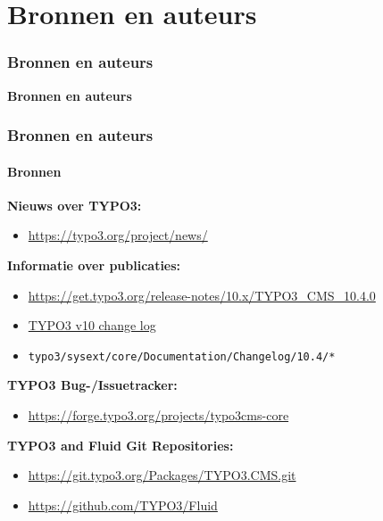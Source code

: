 %

\section{Bronnen en auteurs}
\begin{frame}[fragile]
	\frametitle{Bronnen en auteurs}

	\begin{center}\huge{\color{typo3darkgrey}\textbf{Bronnen en auteurs}}\end{center}
	\begin{center}\large{\textit{}}\end{center}

\end{frame}


\begin{frame}[fragile]
	\frametitle{Bronnen en auteurs}
	\framesubtitle{Bronnen}

	\textbf{Nieuws over TYPO3:}
		\begin{itemize}\smaller
			\item \url{https://typo3.org/project/news/}
		\end{itemize}

	\textbf{Informatie over publicaties:}
		\begin{itemize}\smaller
			\item \url{https://get.typo3.org/release-notes/10.x/TYPO3_CMS_10.4.0}
			\item \href{https://docs.typo3.org/c/typo3/cms-core/master/en-us/Changelog-10.html}{TYPO3 v10 change log}
			\item \texttt{typo3/sysext/core/Documentation/Changelog/10.4/*}
		\end{itemize}

	\textbf{TYPO3 Bug-/Issuetracker:}
		\begin{itemize}\smaller
			\item \url{https://forge.typo3.org/projects/typo3cms-core}
		\end{itemize}

	\textbf{TYPO3 and Fluid Git Repositories:}
		\begin{itemize}\smaller
			\item \url{https://git.typo3.org/Packages/TYPO3.CMS.git}
			\item \url{https://github.com/TYPO3/Fluid}
		\end{itemize}

\end{frame}

